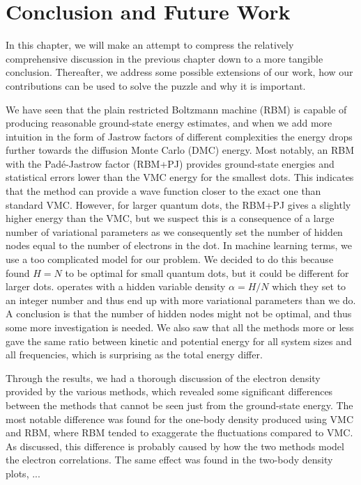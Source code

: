 \chapter{Conclusion and Future Work} \label{sec:conclusion}
In this chapter, we will make an attempt to compress the relatively comprehensive discussion in the previous chapter down to a more tangible conclusion. Thereafter, we address some possible extensions of our work, how our contributions can be used to solve the puzzle and why it is important. 

We have seen that the plain restricted Boltzmann machine (RBM) is capable of producing reasonable ground-state energy estimates, and when we add more intuition in the form of Jastrow factors of different complexities the energy drops further towards the diffusion Monte Carlo (DMC) energy. Most notably, an RBM with the Padé-Jastrow  factor (RBM+PJ) provides ground-state energies and statistical errors lower than the VMC energy for the smallest dots. This indicates that the method can provide a wave function closer to the exact one than standard VMC. However, for larger quantum dots, the RBM+PJ gives a slightly higher energy than the VMC, but we suspect this is a consequence of a large number of variational parameters as we consequently set the number of hidden nodes equal to the number of electrons in the dot. In machine learning terms, we use a too complicated model for our problem. We decided to do this because \citet{nordhagen_computational_2018} found $H=N$ to be optimal for small quantum dots, but it could be different for larger dots. \citet{carleo_solving_2017} operates with a hidden variable density $\alpha=H/N$ which they set to an integer number and thus end up with more variational parameters than we do. A conclusion is that the number of hidden nodes might not be optimal, and thus some more investigation is needed. We also saw that all the methods more or less gave the same ratio between kinetic and potential energy for all system sizes and all frequencies, which is surprising as the total energy differ.

Through the results, we had a thorough discussion of the electron density provided by the various methods, which revealed some significant differences between the methods that cannot be seen just from the ground-state energy. The most notable difference was found for the one-body density produced using VMC and RBM, where RBM tended to exaggerate the fluctuations compared to VMC. As discussed, this difference is probably caused by how the two methods model the electron correlations. The same effect was found in the two-body density plots, ... 

